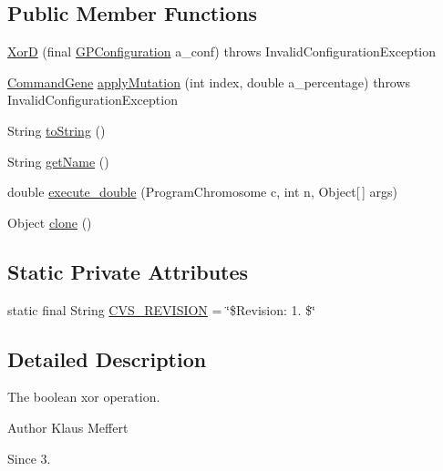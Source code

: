 \subsection*{Public Member Functions}
\begin{DoxyCompactItemize}
\item 
\hyperlink{classexamples_1_1gp_1_1symbolic_regression_1_1_xor_d_a3554e79f773e3722c6435bdd69ad2014}{Xor\-D} (final \hyperlink{classorg_1_1jgap_1_1gp_1_1impl_1_1_g_p_configuration}{G\-P\-Configuration} a\-\_\-conf)  throws Invalid\-Configuration\-Exception 
\item 
\hyperlink{classorg_1_1jgap_1_1gp_1_1_command_gene}{Command\-Gene} \hyperlink{classexamples_1_1gp_1_1symbolic_regression_1_1_xor_d_a78afab66caea0e708cfd8f1810d6cca6}{apply\-Mutation} (int index, double a\-\_\-percentage)  throws Invalid\-Configuration\-Exception 
\item 
String \hyperlink{classexamples_1_1gp_1_1symbolic_regression_1_1_xor_d_afc90e13ddd040699c3a2f0724ef87cd5}{to\-String} ()
\item 
String \hyperlink{classexamples_1_1gp_1_1symbolic_regression_1_1_xor_d_acba308623f662b5f9e21449bf149f057}{get\-Name} ()
\item 
double \hyperlink{classexamples_1_1gp_1_1symbolic_regression_1_1_xor_d_a68fe0ba360e780a820004de1c8931611}{execute\-\_\-double} (Program\-Chromosome c, int n, Object\mbox{[}$\,$\mbox{]} args)
\item 
Object \hyperlink{classexamples_1_1gp_1_1symbolic_regression_1_1_xor_d_a7baf88f1c013cfd23dd68935a171d2c2}{clone} ()
\end{DoxyCompactItemize}
\subsection*{Static Private Attributes}
\begin{DoxyCompactItemize}
\item 
static final String \hyperlink{classexamples_1_1gp_1_1symbolic_regression_1_1_xor_d_a8d73f9a5f4c5f3f318483672fb1529ed}{C\-V\-S\-\_\-\-R\-E\-V\-I\-S\-I\-O\-N} = \char`\"{}\$Revision\-: 1. \$\char`\"{}
\end{DoxyCompactItemize}


\subsection{Detailed Description}
The boolean xor operation.

\begin{DoxyAuthor}{Author}
Klaus Meffert 
\end{DoxyAuthor}
\begin{DoxySince}{Since}
3. 
\end{DoxySince}


